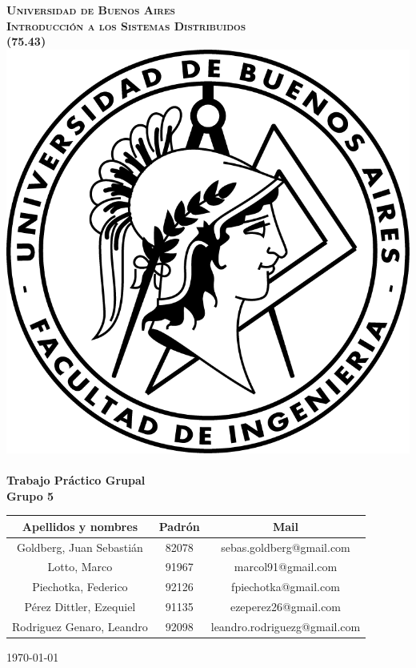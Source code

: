 \begin{titlepage}
\begin{center}


\textsc{\LARGE \textbf{Universidad de Buenos Aires}}\\%
\vfill
\textsc{\LARGE \textbf{Introducción a los Sistemas Distribuidos}}\\%
\vfill
\textsc{\LARGE \textbf{(75.43)}}\\%
\vfill
\vfill
\includegraphics[scale=1.25]{./logo.png}~\\[2cm]
{ \huge \bfseries Trabajo Práctico Grupal}\\%
\vfill
{ \huge \bfseries Grupo 5}\\%
\vfill
{\Large
\begin{tabular}{|c|c|c|}
\hline
Apellidos y nombres 		& Padrón	& 	Mail \\
\hline
Goldberg, Juan Sebastián 			& 82078		& sebas.goldberg@gmail.com \\
\hline
Lotto, Marco 				& 91967 	& marcol91@gmail.com \\
\hline
Piechotka, Federico 			& 92126 	& fpiechotka@gmail.com \\
\hline
Pérez Dittler, Ezequiel 		& 91135 	& ezeperez26@gmail.com \\
\hline
Rodriguez Genaro, Leandro 		& 92098  	& leandro.rodriguezg@gmail.com \\
\hline
\end{tabular}
}
\vfill

{\large \today}

\end{center}
\end{titlepage}
